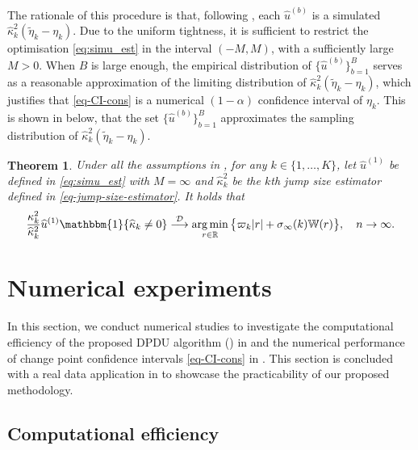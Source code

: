 \documentclass[11pt]{article}
\DeclareMathOperator*{\argmin}{arg\,min}
\theoremstyle{plain}
\newtheorem{theorem}{Theorem}
\theoremstyle{definition}
\begin{document}
The rationale of this procedure is that, following , each $\widehat{u}^{(b)}$ is a simulated $\widehat{\kappa}^2_k (\widetilde{\eta}_k - \eta_k)$.  Due to the uniform tightness, it is sufficient to restrict the optimisation \eqref{eq:simu_est} in the interval $(-M, M)$, with a sufficiently large $M > 0$.  When $B$ is large enough, the empirical distribution of $\{\widehat{u}^{(b)}\}_{b = 1}^B$ serves as a reasonable approximation of the limiting distribution of $\widehat{\kappa}^2_k (\widetilde{\eta}_k - \eta_k)$, which justifies that \eqref{eq-CI-cons} is a numerical $(1-\alpha)$ confidence interval of $\eta_k$.  This is shown in  below, that the set $\{\widehat{u}^{(b)}\}_{b = 1}^B$ approximates the sampling distribution of $\widehat \kappa_k^{2}(\widetilde{\eta}_k - \eta_k)$.

\begin{theorem}\label{thm:sampling_dist}
Under all the assumptions in , for any $k \in \{1, \ldots, K\}$, let $\widehat{u}^{(1)}$ be defined in \eqref{eq:simu_est} with $M = \infty$ and $\widehat{\kappa}^2_k$ be the $k$th jump size estimator defined in \eqref{eq-jump-size-estimator}.  It holds that
    \begin{align*}
        \frac{\kappa_k^2}{\widehat{\kappa}_k^2}\widehat{u}^{(1)} \mathbbm{1}\{\widehat{\kappa}_k \neq 0\} \overset{\mathcal{D}}{\longrightarrow} \argmin_{r \in \mathbb{R}} \big\{\varpi_k|r| + \sigma_{\infty}(k)\mathbb{W}(r)\big\}, \quad n \to \infty.
    \end{align*}
\end{theorem}

\section{Numerical experiments}\label{sec:numeric_study}
In this section, we conduct numerical studies to investigate the computational efficiency of the proposed DPDU algorithm () in  and the numerical performance of change point confidence intervals \eqref{eq-CI-cons} in . This section is concluded with a real data application in  to showcase the practicability of our proposed methodology.

\subsection{Computational efficiency}\label{sec:comp_DPDU}
\end{document}
